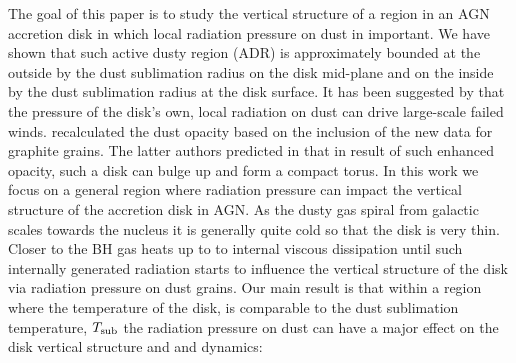 \documentclass[12pt,english,preprint]{aastex}
\begin{document}
The goal of this paper is to study the vertical structure of a region
in an AGN accretion disk in which local radiation pressure on dust
in important. We have shown that such active dusty region (ADR) is
approximately bounded at the outside by the dust sublimation radius
on the disk mid-plane and on the inside by the dust sublimation radius
at the disk surface. It has been suggested by \citep{CzernyHryniewicz11}
that the pressure of the disk's own, local radiation on dust can drive
large-scale \textquotedbl failed\textquotedbl{} winds. \citet{BaskinLaor2018MNRAS}
recalculated the dust opacity based on the inclusion of the new data
for graphite grains. The latter authors predicted in that in result
of such enhanced opacity, such a disk can \textquotedbl bulge up\textquotedbl{}
and form a compact torus. In this work we focus on a general region
where radiation pressure can impact the vertical structure of the
accretion disk in AGN. As the dusty gas spiral from galactic scales
towards the nucleus it is generally quite cold so that the disk is
very thin. Closer to the BH gas heats up to to internal \textquotedbl viscous\textquotedbl{}
dissipation until such internally generated radiation starts to influence
the vertical structure of the disk via radiation pressure on dust
grains. Our main result is that within a region where the temperature
of the disk, is comparable to the dust sublimation temperature, $T_{{\rm sub}}$
the radiation pressure on dust can have a major effect on the disk
vertical structure and and dynamics: 
\end{document}
